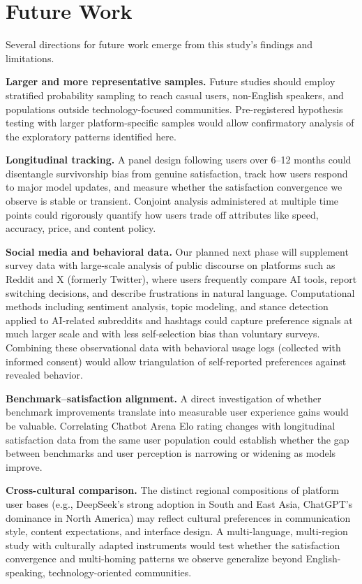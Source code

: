 \documentclass[10pt,twocolumn]{article}
\begin{document}
\section{Future Work}

Several directions for future work emerge from this study's findings and limitations.

\textbf{Larger and more representative samples.} Future studies should employ stratified probability sampling to reach casual users, non-English speakers, and populations outside technology-focused communities. Pre-registered hypothesis testing with larger platform-specific samples would allow confirmatory analysis of the exploratory patterns identified here.

\textbf{Longitudinal tracking.} A panel design following users over 6--12 months could disentangle survivorship bias from genuine satisfaction, track how users respond to major model updates, and measure whether the satisfaction convergence we observe is stable or transient. Conjoint analysis administered at multiple time points could rigorously quantify how users trade off attributes like speed, accuracy, price, and content policy.

\textbf{Social media and behavioral data.} Our planned next phase will supplement survey data with large-scale analysis of public discourse on platforms such as Reddit and X (formerly Twitter), where users frequently compare AI tools, report switching decisions, and describe frustrations in natural language. Computational methods including sentiment analysis, topic modeling, and stance detection applied to AI-related subreddits and hashtags could capture preference signals at much larger scale and with less self-selection bias than voluntary surveys. Combining these observational data with behavioral usage logs (collected with informed consent) would allow triangulation of self-reported preferences against revealed behavior.

\textbf{Benchmark--satisfaction alignment.} A direct investigation of whether benchmark improvements translate into measurable user experience gains would be valuable. Correlating Chatbot Arena Elo rating changes with longitudinal satisfaction data from the same user population could establish whether the gap between benchmarks and user perception is narrowing or widening as models improve.

\textbf{Cross-cultural comparison.} The distinct regional compositions of platform user bases (e.g., DeepSeek's strong adoption in South and East Asia, ChatGPT's dominance in North America) may reflect cultural preferences in communication style, content expectations, and interface design. A multi-language, multi-region study with culturally adapted instruments would test whether the satisfaction convergence and multi-homing patterns we observe generalize beyond English-speaking, technology-oriented communities.
\end{document}
